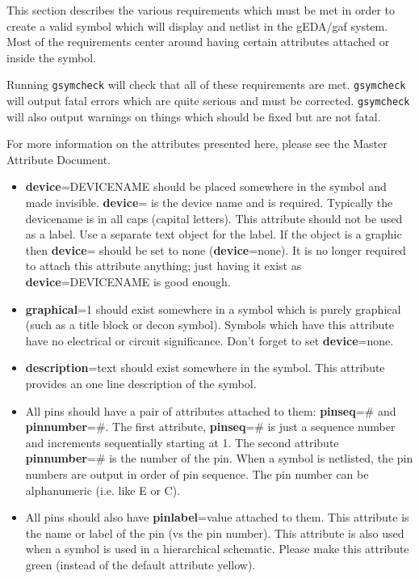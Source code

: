 \documentclass{article}
\begin{document}
This section describes the various requirements which must be met in order
to create a valid symbol which will display and netlist in the gEDA/gaf
system.  Most of the requirements center around having certain attributes
attached or inside the symbol.  

Running {\tt gsymcheck} will check that all of these requirements are met.
{\tt gsymcheck} will output fatal errors which are quite serious and must
be corrected.  {\tt gsymcheck} will also output warnings on things which
should be fixed but are not fatal.  

For more information on the attributes presented here, please see the
Master Attribute Document.

\begin{itemize}
\item {\bf device}=DEVICENAME should be placed somewhere in the symbol
      and made invisible.  {\bf device}= is the device name and
      is required.  Typically the devicename is in all caps (capital
      letters).  This attribute should not be used as a label.  Use a
      separate text object for the label.  If the object is a graphic
      then {\bf device}= should be set to none ({\bf device}=none).
      It is no longer required to attach this attribute anything; just
      having it exist as {\bf device}=DEVICENAME is good enough.

\item {\bf graphical}=1 should exist somewhere in a symbol which is purely
      graphical (such as a title block or decon symbol).  Symbols which
      have this attribute have no electrical or circuit significance.
      Don't forget to set {\bf device}=none.

\item {\bf description}=text should exist somewhere in the symbol.  This 
      attribute provides an one line description of the symbol.

\item All pins should have a pair of attributes attached to them:  
      {\bf pinseq}=\# and {\bf pinnumber}=\#.  The first attribute, 
      {\bf pinseq}=\# is just a sequence number and increments sequentially
      starting at 1.  The second attribute {\bf pinnumber}=\# is the number
      of the pin.  When a symbol is netlisted, the pin numbers are output
      in order of pin sequence.  The pin number can be alphanumeric (i.e. like
      E or C).

\item All pins should also have {\bf pinlabel}=value attached to them.
      This attribute is the name or label of the pin (vs the pin number).
      This attribute is also used when a symbol is used in a hierarchical
      schematic.  Please make this attribute green (instead of the
      default attribute yellow).


\end{itemize}
\end{document}
